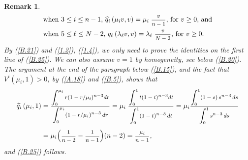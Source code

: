 \documentclass[12pt,leqno]{article}
\def\dis{\displaystyle}
\def\f{\footnotesize}
\def\wh{\widehat}
\newtheorem{remark}[theorem]{Remark}
\begin{document}
\begin{appendix}
\begin{remark}\label{remB.3}  \rm
\begin{equation}\label{B.25}
\begin{array}{ll}
\mbox{when $3 \le i \le n-1$, $\wh{q}_i\,(\mu_iv, v)= \mu_i \; \mbox{\f $\dis\frac{v}{n-1}$}$, for $v \ge 0$, and}
\\[2ex]
\mbox{when $ 5 \le \ell \le N-2$, $q_\ell\, (\lambda_\ell v, v) = \lambda_\ell \; \mbox{\f $\dis\frac{v}{N-2}$}$, for $v \ge 0$}. 
\end{array}
\end{equation}
By (\ref{B.21}) and (\ref{1.2}), (\ref{1.4}), we only need to prove the identities on the first line of (\ref{B.25}). We can also assume $v=1$ by homogeneity, see below (\ref{B.20}). The argument at the end of the paragraph below (\ref{B.15}), and the fact that $V^i (\mu_i, 1) > 0$, by (\ref{A.18}) and (\ref{B.5}), shows that
\begin{equation}\label{B.26}
\begin{split}
\wh{q}_i \,(\mu_i,1) & = \mbox{\f $\dis\frac{\dis\int^{\mu_i}_0 r(1-r/\mu_i)^{n-3} dr}{\dis\int^{\mu_i}_0 (1-r/\mu_i)^{n-3} \,dr}$} = \mu_i \; \mbox{\f $\dis\frac{\dis\int^{1}_0 t(1-t)^{n-3} dt}{\dis\int^{1}_0 (1-t)^{n-3} \,dt}$} = \mu_i \mbox{\f $\dis\frac{\dis\int^{1}_0 (1-s) \,s^{n-3}\,ds}{\dis\int^{1}_0 s^{n-3} \,ds}$} 
\\[1ex]
& = \mu_i \Big( \mbox{\f $\dis\frac{1}{n-2}$} - \mbox{\f $\dis\frac{1}{n-1}$}\Big) (n-2) = \mbox{\f $\dis\frac{\mu_i}{n-1}$},
\end{split}
\end{equation}
and (\ref{B.25}) follows.


\end{remark}
\end{appendix}
\end{document}
